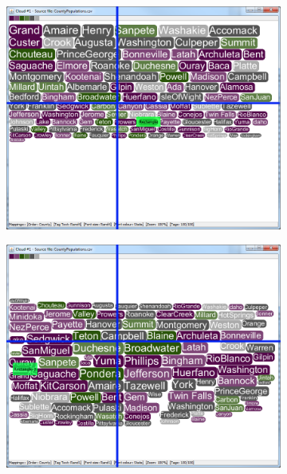 \begin{figure}[!htb]
\begin{subfigure}{.5\textwidth}
  \includegraphics[scale=0.25]{Experiment1/Trial3/C1S1L2.png}
\end{subfigure}%
\begin{subfigure}{.5\textwidth}
  \centering
 \includegraphics[scale=0.25]{Experiment1/Trial3/C1S1L1.png}
\end{subfigure}
\begin{subfigure}{.5\textwidth}
  \centering

\end{subfigure}
\end{figure}
